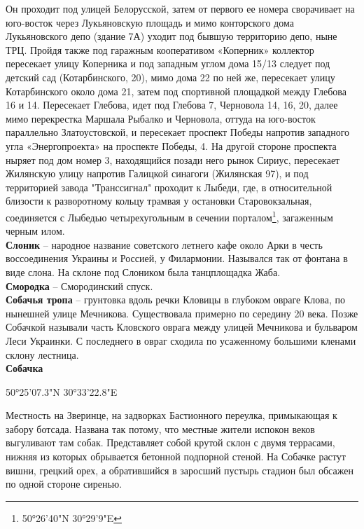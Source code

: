 Он проходит под улицей Белорусской, затем от первого ее номера сворачивает на юго-восток через Лукьяновскую площадь и мимо конторского дома Лукьяновского депо (здание 7А) уходит под бывшую территорию депо, ныне ТРЦ. Пройдя также под гаражным кооперативом «Коперник» коллектор пересекает улицу Коперника и под западным углом дома 15/13 следует под детский сад (Котарбинского, 20), мимо дома 22 по ней же, пересекает улицу Котарбинского около дома 21, затем под спортивной площадкой между Глебова 16 и 14. Пересекает Глебова, идет под Глебова 7, Черновола 14, 16, 20, далее мимо перекрестка Маршала Рыбалко и Черновола, оттуда на юго-восток параллельно Златоустовской, и пересекает проспект Победы напротив западного угла «Энергопроекта» на проспекте Победы, 4. На другой стороне проспекта ныряет под дом номер 3, находящийся позади него рынок Сириус, пересекает Жилянскую улицу напротив Галицкой синагоги (Жилянская 97), и под территорией завода "Транссигнал" проходит к Лыбеди, где, в относительной близости к разворотному кольцу трамвая у остановки Старовокзальная, соединяется с Лыбедью четырехугольным в сечении порталом\footnote{50°26'40"N 30°29'9"E}, загаженным черным илом.\\

\textbf{Слоник} – народное название советского летнего кафе около Арки в честь воссоединения Украины и Россией, у Филармонии. Назывался так от фонтана в виде слона. На склоне под Слоником была танцплощадка Жаба.\\

\textbf{Смородка} – Смородинский спуск.\\

\textbf{Собачья тропа} – грунтовка вдоль речки Кловицы в глубоком овраге Клова, по нынешней улице Мечникова. Существовала примерно по середину 20 века. Позже Собачкой называли часть Кловского оврага между улицей Мечникова и бульваром Леси Украинки. С последнего в овраг сходила по усаженному большими кленами склону лестница.\\

\textbf{Собачка} 

50°25'07.3"N 30°33'22.8"E

Местность на Зверинце, на задворках Бастионного переулка, примыкающая к забору ботсада. Названа так потому, что местные жители испокон веков выгуливают там собак. Представляет собой крутой склон с двумя террасами, нижняя из которых обрывается бетонной подпорной стеной. На Собачке растут вишни, грецкий орех, а обратившийся в заросший пустырь стадион был обсажен по одной стороне сиренью.

